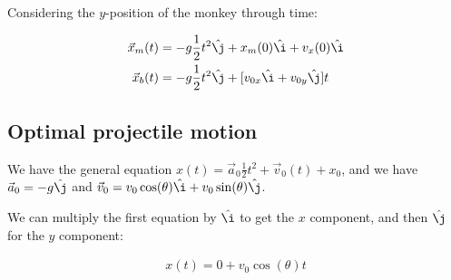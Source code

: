 \documentclass{article}
\theoremstyle{definition}
\numberwithin{equation}{section}
\numberwithin{definition}{section}
\begin{document}
Considering the $y$-position of the monkey through time: 

\begin{align*}
	\vec x_m(t) &= -g \frac{1}{2} t^2 \hat \j + x_m(0) \hat \i + v_x(0) \hat \i\\
	\vec x_b(t) &= -g \frac{1}{2} t^2 \hat \j + [v_{0x} \hat \i + v_{0y} \hat \j] t
\end{align*}


\subsection{Optimal projectile motion}

We have the general equation $x(t) = \vec a_0 \frac{1}{2} t^2  + \vec v_0(t) + x_0$, and we have $\vec a_0 = -g\hat \j$ and $\vec v_0 = v_0 \cos(\theta) \hat \i + v_0 \sin(\theta) \hat \j$. 

We can multiply the first equation by $\hat \i$ to get the $x$ component, and then $\hat \j$ for the $y$ component:

\begin{align*}
	x(t) = 0 + v_0\cos(\theta) t \\
\end{align*}


	
\end{document}
